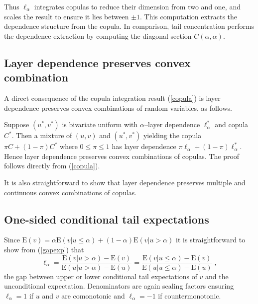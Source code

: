 \documentclass[authoryear]{elsarticle}
\newcommand{\E}{{\mathrm E}}
\newcommand{\eref}[1]{(\ref{#1})}
\begin{document}
Thus $\ell_\alpha$ integrates copulas to reduce their dimension from two and one, and scales the result to ensure it lies between $\pm 1$. This computation extracts the dependence structure from the copula. In comparison, tail concentration performs the dependence extraction by computing the diagonal section $C(\alpha,\alpha)$.

\subsection{Layer dependence preserves convex combination}

A direct consequence of the copula integration result \eref{copula} is layer dependence preserves convex combinations of random variables, as follows.

Suppose $(u^*,v^*)$ is bivariate uniform with $\alpha$--layer dependence $\ell_\alpha^*$ and copula $C^*$. Then a mixture of $(u,v)$ and $(u^*,v^*)$ yielding the copula $\pi C+(1-\pi)C^*$ where $0\le \pi\le 1$ has layer dependence $\pi\ell_\alpha+(1-\pi)\ell_\alpha^*$. Hence layer dependence preserves convex combinations of copulas. The proof follows directly from \eref{copula}.

It is also straightforward to show that layer dependence preserves multiple and continuous convex combinations of copulas.



\subsection{One-sided conditional tail expectations}


Since $\E(v)=\alpha\E(v|u\leq \alpha)+(1-\alpha)\E(v|u>\alpha)$ it is straightforward to show from \eref{gapexp} that
$$
\ell_\alpha = \frac{\E(v|u> \alpha)-\E(v)}{\E(u|u> \alpha)-\E(u)} = \frac{\E(v|u\leq \alpha)-\E(v)}{\E(u|u\leq \alpha)-\E(u)} \;,
$$
the gap between upper or lower conditional tail expectations of $v$ and the unconditional expectation. Denominators are again scaling factors ensuring $\ell_\alpha=1$ if $u$ and $v$ are comonotonic and $\ell_\alpha=-1$ if countermonotonic.
\end{document}
